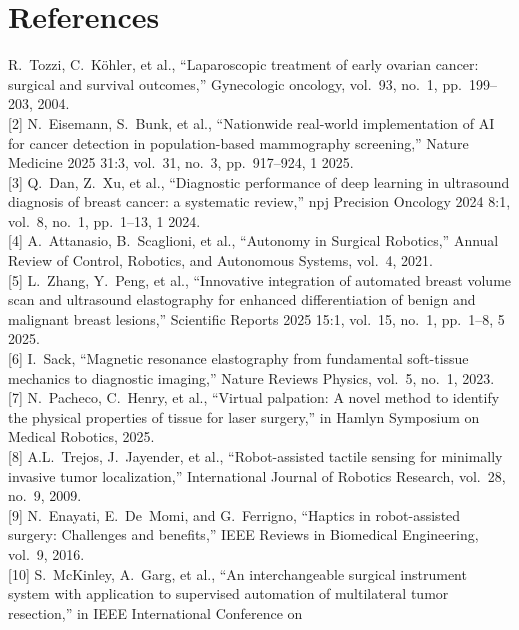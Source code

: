 \documentclass[11pt]{article}
\begin{document}
\section*{References}

\begin{footnotesize}
\noindent
[1] R.~Tozzi, C.~K\"ohler, et al., ``Laparoscopic treatment of early
ovarian cancer: surgical and survival outcomes,'' Gynecologic
oncology, vol.~93, no.~1, pp.~199--203, 2004.\\[2pt]
[2] N.~Eisemann, S.~Bunk, et al., ``Nationwide real-world
implementation of AI for cancer detection in population-based
mammography screening,'' Nature Medicine 2025 31:3, vol.~31, no.~3,
pp.~917--924, 1 2025.\\[2pt]
[3] Q.~Dan, Z.~Xu, et al., ``Diagnostic performance of deep learning
in ultrasound diagnosis of breast cancer: a systematic review,'' npj
Precision Oncology 2024 8:1, vol.~8, no.~1, pp.~1--13, 1 2024.\\[2pt]
[4] A.~Attanasio, B.~Scaglioni, et al., ``Autonomy in Surgical
Robotics,'' Annual Review of Control, Robotics, and Autonomous
Systems, vol.~4, 2021.\\[2pt]
[5] L.~Zhang, Y.~Peng, et al., ``Innovative integration of automated
breast volume scan and ultrasound elastography for enhanced
differentiation of benign and malignant breast lesions,'' Scientific
Reports 2025 15:1, vol.~15, no.~1, pp.~1--8, 5 2025.\\[2pt]
[6] I.~Sack, ``Magnetic resonance elastography from fundamental
soft-tissue mechanics to diagnostic imaging,'' Nature Reviews
Physics, vol.~5, no.~1, 2023.\\[2pt]
[7] N.~Pacheco, C.~Henry, et al., ``Virtual palpation: A novel method
to identify the physical properties of tissue for laser surgery,''
in Hamlyn Symposium on Medical Robotics, 2025.\\[2pt]
[8] A.L.~Trejos, J.~Jayender, et al., ``Robot-assisted tactile
sensing for minimally invasive tumor localization,'' International
Journal of Robotics Research, vol.~28, no.~9, 2009.\\[2pt]
[9] N.~Enayati, E.~De~Momi, and G.~Ferrigno, ``Haptics in
robot-assisted surgery: Challenges and benefits,'' IEEE Reviews in
Biomedical Engineering, vol.~9, 2016.\\[2pt]
[10] S.~McKinley, A.~Garg, et al., ``An interchangeable surgical
instrument system with application to supervised automation of
multilateral tumor resection,'' in IEEE International Conference on

\end{footnotesize}
\end{document}
